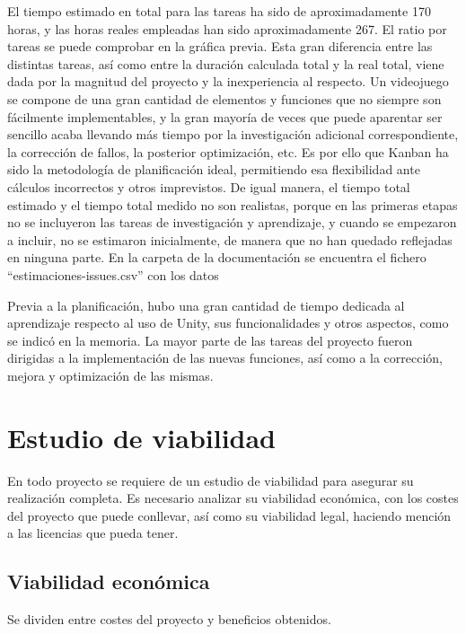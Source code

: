 
El tiempo estimado en total para las tareas ha sido de aproximadamente 170 horas, y las horas reales empleadas han sido aproximadamente 267. El ratio por tareas se puede comprobar en la gráfica previa. Esta gran diferencia entre las distintas tareas, así como entre la duración calculada total y la real total, viene dada por la magnitud del proyecto y la inexperiencia al respecto. Un videojuego se compone de una gran cantidad de elementos y funciones que no siempre son fácilmente implementables, y la gran mayoría de veces que puede aparentar ser sencillo acaba llevando más tiempo por la investigación adicional correspondiente, la corrección de fallos, la posterior optimización, etc. Es por ello que Kanban ha sido la metodología de planificación ideal, permitiendo esa flexibilidad ante cálculos incorrectos y otros imprevistos. De igual manera, el tiempo total estimado y el tiempo total medido no son realistas, porque en las primeras etapas no se incluyeron las tareas de investigación y aprendizaje, y cuando se empezaron a incluir, no se estimaron inicialmente, de manera que no han quedado reflejadas en ninguna parte. En la carpeta de la documentación se encuentra el fichero ``estimaciones-issues.csv'' con los datos 

Previa a la planificación, hubo una gran cantidad de tiempo dedicada al aprendizaje respecto al uso de Unity, sus funcionalidades y otros aspectos, como se indicó en la memoria. La mayor parte de las tareas del proyecto fueron dirigidas a la implementación de las nuevas funciones, así como a la corrección, mejora y optimización de las mismas.

\section{Estudio de viabilidad}

En todo proyecto se requiere de un estudio de viabilidad para asegurar su realización completa. Es necesario analizar su viabilidad económica, con los costes del proyecto que puede conllevar, así como su viabilidad legal, haciendo mención a las licencias que pueda tener.

\subsection{Viabilidad económica}

Se dividen entre costes del proyecto y beneficios obtenidos.


